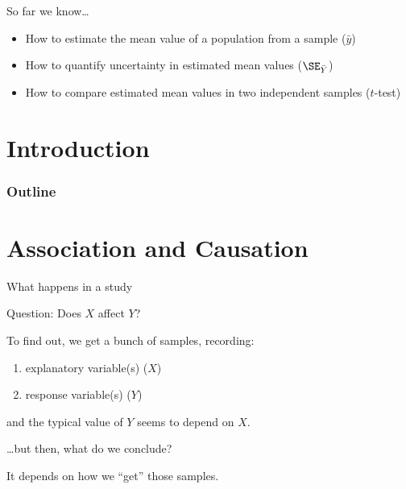 
\subtitle{and One--sided $t$-tests}

\date{17 October 2013}




\begin{frame}
  \maketitle
\end{frame}

\begin{frame}{So far we know\ldots}

    \begin{itemize}
        \item How to estimate the mean value of a population from a sample ($\bar y$)
        \item How to quantify uncertainty in estimated mean values ($\SE_{\bar Y}$)
        \item How to compare estimated mean values in two independent samples ($t$-test)
    \end{itemize}

\end{frame}

\section*{Introduction}
\begin{frame}\frametitle<presentation>{Outline}
  \tableofcontents
\end{frame}


\section{Association and Causation}

\begin{frame}{What happens in a study}

    \alert{Question:} Does $X$ affect $Y$?

    \vspace{2em}

    To find out, we get a bunch of samples, recording:
      \begin{enumerate}
          \item explanatory variable(s) ($X$)
          \item response variable(s) ($Y$)
      \end{enumerate}
    and the typical value of $Y$ seems to depend on $X$.

    \vspace{2em}

    \ldots but then, what do we conclude?

    \vspace{2em}

    \alert{It depends} on how we ``get'' those samples.

\end{frame}

